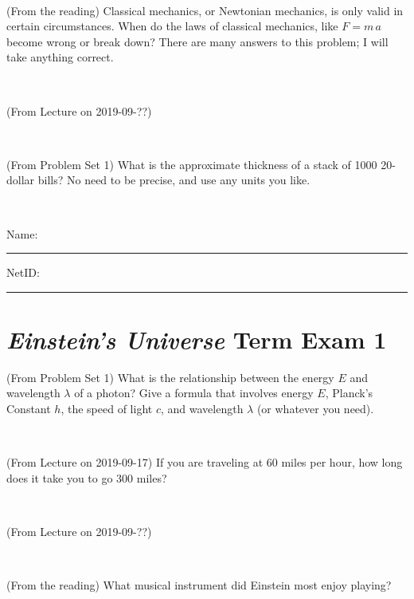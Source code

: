 \documentclass[12pt, letterpaper]{article}
\begin{document}
\vfill ~

\begin{problem} (From the reading)
Classical mechanics, or Newtonian mechanics, is only valid in certain
circumstances. When do the laws of classical mechanics, like $F =
m\,a$ become wrong or break down? There are many answers to this
problem; I will take anything correct.
\end{problem}


\vfill ~

\begin{problem} (From Lecture on 2019-09-??)
\end{problem}


\vfill ~

\begin{problem} (From Problem Set 1)
What is the approximate thickness of a stack of 1000 20-dollar bills?
No need to be precise, and use any units you like.
\end{problem}


\vfill ~


\cleardoublepage



\noindent
Name: \rule[-1ex]{0.60\textwidth}{0.1pt}
NetID: \rule[-1ex]{0.20\textwidth}{0.1pt}

\section*{\textsl{Einstein's Universe} Term Exam 1}
\setcounter{problem}{1}


\begin{problem} (From Problem Set 1)
What is the relationship between the energy $E$ and wavelength
$\lambda$ of a photon? Give a formula that involves energy $E$,
Planck's Constant $h$, the speed of light $c$, and wavelength
$\lambda$ (or whatever you need).
\end{problem}

\vfill ~

\begin{problem} (From Lecture on 2019-09-17)
If you are traveling at 60 miles per hour, how long does
it take you to go 300 miles?
\end{problem}


\vfill ~

\begin{problem} (From Lecture on 2019-09-??)
\end{problem}


\vfill ~

\begin{problem} (From the reading)
What musical instrument did Einstein most enjoy playing?
\end{problem}
\end{document}
